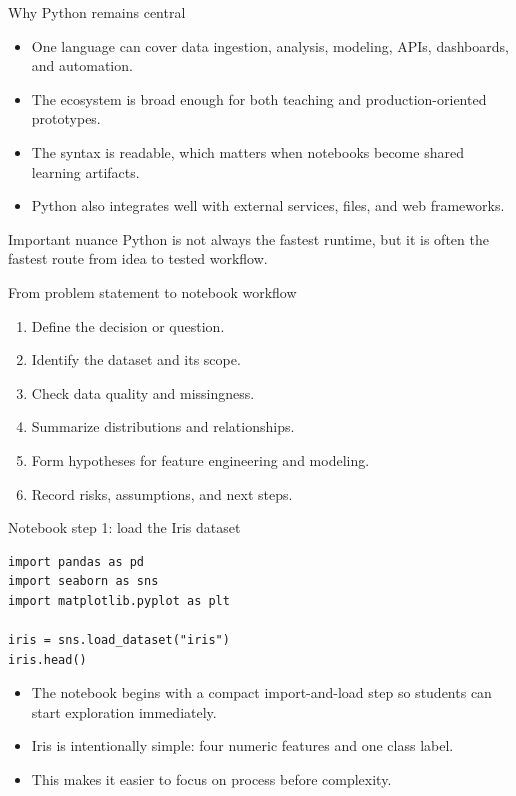 \begin{frame}{Why Python remains central}
\begin{itemize}
\item One language can cover data ingestion, analysis, modeling, APIs, dashboards, and automation.
\item The ecosystem is broad enough for both teaching and production-oriented prototypes.
\item The syntax is readable, which matters when notebooks become shared learning artifacts.
\item Python also integrates well with external services, files, and web frameworks.
\end{itemize}
\begin{block}{Important nuance}
Python is not always the fastest runtime, but it is often the fastest route from idea to tested workflow.
\end{block}
\coursefooter
\end{frame}

\begin{frame}{From problem statement to notebook workflow}
\begin{enumerate}
\item Define the decision or question.
\item Identify the dataset and its scope.
\item Check data quality and missingness.
\item Summarize distributions and relationships.
\item Form hypotheses for feature engineering and modeling.
\item Record risks, assumptions, and next steps.
\end{enumerate}
\coursefooter
\end{frame}

\begin{frame}[fragile]{Notebook step 1: load the Iris dataset}
\begin{lstlisting}[style=coursepython]
import pandas as pd
import seaborn as sns
import matplotlib.pyplot as plt

iris = sns.load_dataset("iris")
iris.head()
\end{lstlisting}
\begin{itemize}
\item The notebook begins with a compact import-and-load step so students can start exploration immediately.
\item Iris is intentionally simple: four numeric features and one class label.
\item This makes it easier to focus on process before complexity.
\end{itemize}
\coursefooter
\end{frame}

